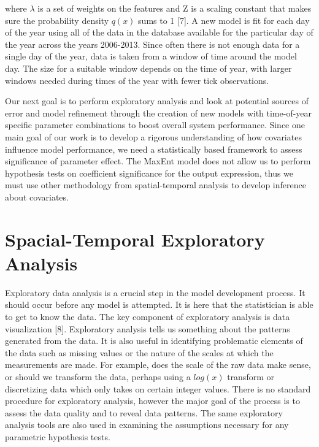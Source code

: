 \noindent where $\lambda $ is a set of weights on the features and Z is a scaling constant that makes sure the probability density $q(x)$ sums to 1 [7]. A new model is fit for each day of the year using all of the data in the database available for the particular day of the year across the years 2006-2013. Since often there is not enough data for a single day of the year, data is taken from a window of time around the model day. The size for a suitable window depends on the time of year, with larger windows needed during times of the year with fewer tick observations.\newline

\noindent Our next goal is to perform exploratory analysis and look at potential sources of error and model refinement through the creation of new models with time-of-year specific parameter combinations to boost overall system performance. Since one main goal of our work is to develop a rigorous understanding of how covariates influence model performance, we need a statistically based framework to assess significance of parameter effect. The MaxEnt model does not allow us to perform hypothesis tests on coefficient significance for the output expression, thus we must use other methodology from spatial-temporal analysis to develop inference about covariates. 


\section{Spacial-Temporal Exploratory Analysis} 

Exploratory data analysis is a crucial step in the model development process. It should occur before any model is attempted. It is here that the statistician is able to get to know the data. The key component of exploratory analysis is data visualization [8]. Exploratory analysis tells us something about the patterns generated from the data. It is also useful in identifying problematic elements of the data such as missing values or the nature of the scales at which the measurements are made. For example, does the scale of the raw data make sense, or should we transform the data, perhaps using a $log(x)$ transform or discretizing data which only takes on certain integer values. There is no standard procedure for exploratory analysis, however the major goal of the process is to assess the data quality and to reveal data patterns. The same exploratory analysis tools are also used in examining the assumptions necessary for any parametric hypothesis tests.\newline


